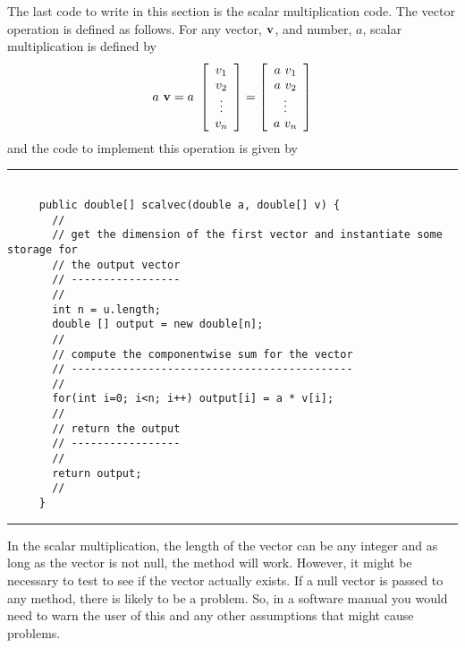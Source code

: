 \documentclass[10pt,fleqn]{article}
\begin{document}
The last code to write in this section is the scalar multiplication code. The
vector operation is defined as follows. For any vector, ${\bf v}$, and number,
$a$, scalar multiplication is defined by
$$
  a\ {\bf v} = 
       a\ \left[
            \begin{array}{c}
              v_1 \\
              v_2 \\
              \vdots \\
              v_n
            \end{array}
          \right]
     = \left[
         \begin{array}{c}
           a\ v_1 \\
           a\ v_2 \\
           \vdots \\
           a\ v_n
         \end{array}
       \right]
$$
and the code to implement this operation is given by
\vskip0.1in\hrule\vskip0.1in
\begin{verbatim}

     public double[] scalvec(double a, double[] v) {
       //
       // get the dimension of the first vector and instantiate some storage for
       // the output vector
       // -----------------
       //
       int n = u.length;
       double [] output = new double[n];
       //
       // compute the componentwise sum for the vector
       // --------------------------------------------
       //
       for(int i=0; i<n; i++) output[i] = a * v[i];
       //
       // return the output
       // -----------------
       //
       return output;
       //
     }

\end{verbatim}
\vskip0.1in\hrule\vskip0.1in
In the scalar multiplication, the length of the vector can be any integer and as
long as the vector is not null, the method will work. However, it might be
necessary to test to see if the vector actually exists. If a null vector is
passed to any method, there is likely to be a problem. So, in a software manual
you would need to warn the user of this and any other assumptions that might
cause problems.
\end{document}
